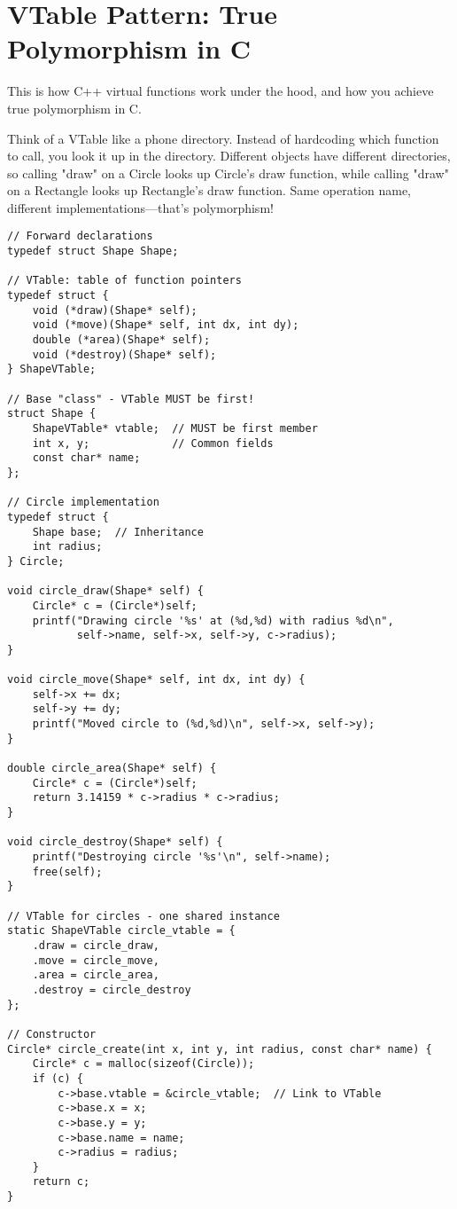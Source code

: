 \section{VTable Pattern: True Polymorphism in C}

This is how C++ virtual functions work under the hood, and how you achieve true polymorphism in C.

Think of a VTable like a phone directory. Instead of hardcoding which function to call, you look it up in the directory. Different objects have different directories, so calling "draw" on a Circle looks up Circle's draw function, while calling "draw" on a Rectangle looks up Rectangle's draw function. Same operation name, different implementations---that's polymorphism!

\begin{lstlisting}
// Forward declarations
typedef struct Shape Shape;

// VTable: table of function pointers
typedef struct {
    void (*draw)(Shape* self);
    void (*move)(Shape* self, int dx, int dy);
    double (*area)(Shape* self);
    void (*destroy)(Shape* self);
} ShapeVTable;

// Base "class" - VTable MUST be first!
struct Shape {
    ShapeVTable* vtable;  // MUST be first member
    int x, y;             // Common fields
    const char* name;
};

// Circle implementation
typedef struct {
    Shape base;  // Inheritance
    int radius;
} Circle;

void circle_draw(Shape* self) {
    Circle* c = (Circle*)self;
    printf("Drawing circle '%s' at (%d,%d) with radius %d\n",
           self->name, self->x, self->y, c->radius);
}

void circle_move(Shape* self, int dx, int dy) {
    self->x += dx;
    self->y += dy;
    printf("Moved circle to (%d,%d)\n", self->x, self->y);
}

double circle_area(Shape* self) {
    Circle* c = (Circle*)self;
    return 3.14159 * c->radius * c->radius;
}

void circle_destroy(Shape* self) {
    printf("Destroying circle '%s'\n", self->name);
    free(self);
}

// VTable for circles - one shared instance
static ShapeVTable circle_vtable = {
    .draw = circle_draw,
    .move = circle_move,
    .area = circle_area,
    .destroy = circle_destroy
};

// Constructor
Circle* circle_create(int x, int y, int radius, const char* name) {
    Circle* c = malloc(sizeof(Circle));
    if (c) {
        c->base.vtable = &circle_vtable;  // Link to VTable
        c->base.x = x;
        c->base.y = y;
        c->base.name = name;
        c->radius = radius;
    }
    return c;
}


\end{lstlisting}
